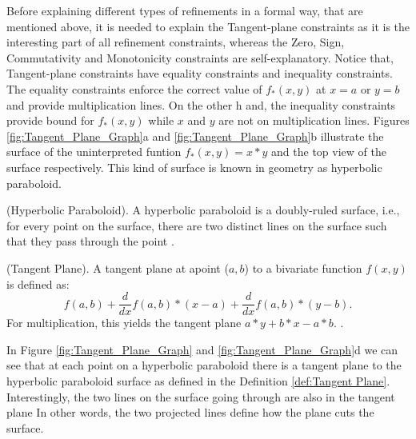 \noindent Before explaining different types of refinements in a formal way, that are mentioned above, it is needed to explain the Tangent-plane constraints as it is the interesting part of all refinement constraints, whereas the Zero, Sign, Commutativity and Monotonicity constraints are self-explanatory.
Notice that, Tangent-plane constraints have equality constraints and inequality constraints.
The equality constraints enforce the correct value of  $f_{\ast}(x, y)$ at $x = a$ or $y = b$ and provide multiplication lines.
On the other h and, the inequality constraints provide bound for $f_{\ast}(x, y)$ while $x$ and $y$ are not on multiplication lines.
Figures \ref{fig:Tangent_Plane_Graph}a and \ref{fig:Tangent_Plane_Graph}b illustrate the surface of the uninterpreted funtion $f_{\ast}(x, y) = x \ast y$ and the top view of the surface respectively.
This kind of surface is known in geometry as hyperbolic paraboloid.\newline

\begin{definition}
    (Hyperbolic Paraboloid).
    A hyperbolic paraboloid is a doubly-ruled surface, i.e., for every point on the surface, there are two distinct lines on the surface such that they pass through the point \cite{Cimatti:2018:ILS:3274693.3230639}.
 \end{definition}
 
 
\begin{definition}
\label{def:Tangent Plane}
    (Tangent Plane).
    A tangent plane at apoint ($a, b$) to a bivariate function $f(x, y)$ is defined as:
    $$f(a, b) + \frac{d}{dx} f(a, b) \ast (x-a) + \frac{d}{dx} f(a, b) \ast (y-b).$$
    For multiplication, this yields the tangent plane $a \ast y + b \ast x - a \ast b$.
    \cite{TangentPlane}.
 \end{definition}

\noindent In Figure \ref{fig:Tangent_Plane_Graph} and \ref{fig:Tangent_Plane_Graph}d we can see that at each point on a hyperbolic paraboloid there is a tangent plane to the hyperbolic paraboloid surface as defined in the Definition \ref{def:Tangent Plane}.
Interestingly, the two lines on the surface going through are also in the tangent plane 
In other words, the two projected lines define how the plane cuts the surface.\newpage

